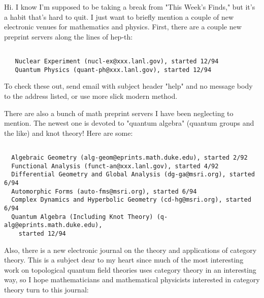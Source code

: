 

Hi.  I know I'm supposed to be taking a break from "This Week's Finds,"
but it's a habit that's hard to quit.  I just want to briefly mention a
couple of new electronic venues for mathematics and physics.  First,
there are a couple new preprint servers along the lines of hep-th:


\begin{verbatim}

   Nuclear Experiment (nucl-ex@xxx.lanl.gov), started 12/94 
   Quantum Physics (quant-ph@xxx.lanl.gov), started 12/94 
\end{verbatim}
    

To check these out, send email with subject header "help" and no message
body to the address listed, or use more slick modern method.

There are also a bunch of math preprint servers I have been neglecting
to mention.  The newest one is devoted to "quantum algebra" (quantum
groups and the like) and knot theory!  Here are some:


\begin{verbatim}

  Algebraic Geometry (alg-geom@eprints.math.duke.edu), started 2/92 
  Functional Analysis (funct-an@xxx.lanl.gov), started 4/92
  Differential Geometry and Global Analysis (dg-ga@msri.org), started 6/94 
  Automorphic Forms (auto-fms@msri.org), started 6/94 
  Complex Dynamics and Hyperbolic Geometry (cd-hg@msri.org), started 6/94 
  Quantum Algebra (Including Knot Theory) (q-alg@eprints.math.duke.edu),
    started 12/94 
\end{verbatim}
    

Also, there is a new electronic journal on the theory and applications
of category theory.  This is a subject dear to my heart since much of
the most interesting work on topological quantum field theories uses
category theory in an interesting way, so I hope mathematicians and
mathematical physicists interested in category theory turn to this
journal:


               

